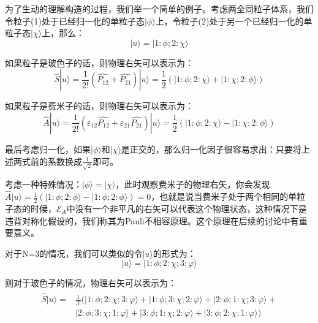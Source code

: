     为了生动的理解构造的过程，我们举一个简单的例子。考虑两全同粒子体系，我们令粒子(1)处于已经归一化的单粒子态$|\phi\rangle$上，令粒子(2)处于另一个已经归一化的单粒子态$|\chi\rangle$上，那么：
    \begin{equation}
        |u\rangle=|1:\phi;2:\chi\rangle
    \end{equation}
    
    如果粒子是玻色子的话，则物理右矢可以表示为：
    \begin{equation}
        \hat{S}|u\rangle=\frac{1}{2!}(\hat{P_{12}}+\hat{P_{21}})|u\rangle=\frac{1}{2}(|1:\phi;2:\chi\rangle+|1:\chi;2:\phi\rangle)
    \end{equation}
    
    如果粒子是费米子的话，则物理右矢可以表示为：
    \begin{equation}
        \hat{A}|u\rangle=\frac{1}{2!}(\varepsilon_{12}\hat{P_{12}}+\varepsilon_{21}\hat{P_{21}})|u\rangle=\frac{1}{2}(|1:\phi;2:\chi\rangle-|1:\chi;2:\phi\rangle)
    \end{equation}
    
    最后考虑归一化，如果$|\phi\rangle$和$|\chi\rangle$是正交的，那么归一化因子很容易求出：只要将上述两式前的系数换成$\frac{1}{\sqrt{2}}$即可。
    \begin{remark}
    考虑一种特殊情况：$|\phi\rangle=|\chi\rangle$，此时观察费米子的物理右矢，你会发现$\hat{A}|u\rangle=\frac{1}{2}(|1:\phi;2:\phi\rangle-|1:\phi;2:\phi\rangle)=0$，也就是说当费米子处于两个相同的单粒子态的时候，$\mathscr{E}_A$中没有一个非平凡的右矢可以代表这个物理状态，这种情况下是违背对称化假设的，我们称其为Pauli不相容原理。这个原理在后续的讨论中有重要意义。
    \end{remark}
    
    对于N=3的情况，我们可以类似的令$|u\rangle$的形式为：
    \begin{equation}
        |u\rangle=|1:\phi;2:\chi;3:\varphi\rangle
    \end{equation}
    
    则对于玻色子的情况，物理右矢可以表示为：
    \begin{align}
         \begin{split}
             \hat{S}|u\rangle=&\frac{1}{3!}(|1:\phi;2:\chi;3:\varphi\rangle+|1:\phi;3:\chi;2:\varphi\rangle+|2:\phi;1:\chi;3:\varphi\rangle+\\
             &|2:\phi;3:\chi;1:\varphi\rangle+|3:\phi;1:\chi;2:\varphi\rangle+|3:\phi;2:\chi;1:\varphi\rangle)
         \end{split}
    \end{align}
       
